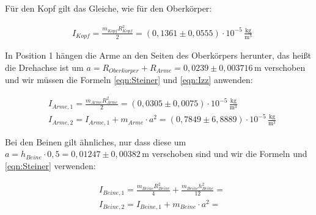 Für den Kopf gilt das Gleiche, wie für den Oberkörper:

\begin{align*}
  & I_{Kopf} = \frac{m_{Kopf}R_{Kopf}^2}{2} = (0{,}1361 \pm 0{,}0555) \cdot 10^{-5} \, \mathrm{\frac{kg}{m^3}}
\end{align*}

In Position 1 hängen die Arme an den Seiten des Oberkörpers herunter, das heißt die Drehachse ist um $a = R_{Oberk\ddot{o}rper} + R_{Arme} = 0{,}0239 \pm 0{,}003716 \, \mathrm{m}$
verschoben und wir müssen die Formeln \ref{eqn:Steiner} und \ref{eqn:Izz} anwenden:

\begin{align*}
  & I_{Arme,1} = \frac{m_{Arme}R_{Arme}^2}{2} = (0{,}0305 \pm 0{,}0075) \cdot 10^{-5} \, \mathrm{\frac{kg}{m^3}} \\
  & I_{Arme,2} = I_{Arme,1} + m_{Arme} \cdot a^2 = (0{,}7849 \pm 6{,}8889) \cdot 10^{-5} \, \mathrm{\frac{kg}{m^3}}
\end{align*}

Bei den Beinen gilt ähnliches, nur dass diese um $a = h_{Beine} \cdot 0{,}5 = 0{,}01247 \pm 0{,}00382 \, \mathrm{m}$ verschoben sind
und wir die Formeln \label{eqn:Izx} und \ref{eqn:Steiner} verwenden:

\begin{align*}
  & I_{Beine,1} = \frac{m_{Beine}R_{Beine}^2}{4} + \frac{m_{Beine}h_{Beine}^2}{12} =  \\
  & I_{Beine,2} = I_{Beine,1} + m_{Beine} \cdot a^2 = 
\end{align*}

